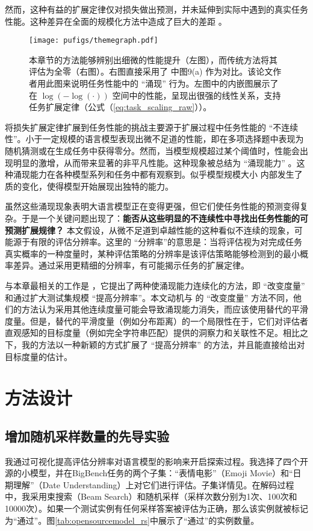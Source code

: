 然而，这种有益的扩展定律仅对损失做出预测，并未延伸到实际中遇到的真实任务性能。这种差异在全面的规模化方法中造成了巨大的差距 \citep{ganguli2022predictability}。

\begin{figure}[!htbp]
        \centering
        \texttt{[image: pufigs/themegraph.pdf]}
    \caption{本章节的方法能够辨别出细微的性能提升（左图），而传统方法将其评估为全零（右图）。右图直接采用了 \citet{sorscher2022beyond} 中图9(a) 作为对比。该论文作者用此图来说明任务性能中的 “涌现” 行为。左图中的内嵌图展示了在 $\log(-\log(\cdot))$ 空间中的性能，呈现出很强的线性关系，支持任务扩展定律（公式（\ref{eq:task_scaling_raw}））。}
    \label{fig:themefig}
\end{figure}

将损失扩展定律扩展到任务性能的挑战主要源于扩展过程中任务性能的 “不连续性”。小于一定规模的语言模型表现出微不足道的性能，即在多项选择题中表现为随机猜测或在生成任务中获得零分。然而，当模型规模超过某个阈值时，性能会出现明显的激增，从而带来显著的非平凡性能。这种现象被总结为 “涌现能力” \citep{srivastava2022beyond, wei2022emergent}。这种涌现能力在各种模型系列和任务中都有观察到。似乎模型规模大小 内部发生了质的变化，使得模型开始展现出独特的能力。

虽然这些涌现现象表明大语言模型正在变得更强，但它们使任务性能的预测变得复杂。于是一个关键问题出现了：\textbf{能否从这些明显的不连续性中寻找出任务性能的可预测扩展规律？} 本文假设，从微不足道到卓越性能的这种看似不连续的现象，可能源于有限的评估分辨率。这里的 “分辨率”的意思是：当将评估视为对完成任务真实概率的一种度量时，某种评估策略的分辨率是该评估策略能够检测到的最小概率差异。通过采用更精细的分辨率，有可能揭示任务的扩展定律。 

与本章最相关的工作是 \citet{schaeffer2023emergent}，它提出了两种使涌现能力连续化的方法，即 “改变度量” 和通过扩大测试集规模 “提高分辨率”。本文动机与 \citet{schaeffer2023emergent} 的 “改变度量” 方法不同，他们的方法认为采用其他连续度量可能会导致涌现能力消失，而应该使用替代的平滑度量。但是，替代的平滑度量（例如分布距离）的一个局限性在于，它们对评估者直观感知的目标度量（例如完全字符串匹配）提供的洞察力和关联性不足。相比之下，我的方法以一种新颖的方式扩展了 “提高分辨率” 的方法，并且能直接给出对目标度量的估计。

\section{方法设计}
\subsection{增加随机采样数量的先导实验}
\label{sec:pilot}
我通过可视化提高评估分辨率对语言模型的影响来开启探索过程。我选择了四个开源的小模型，并在BigBench任务的两个子集\citep{srivastava2022beyond}：“表情电影”（Emoji Movie）和“日期理解”（Date Understanding）上对它们进行评估。子集详情见。在解码过程中，我采用束搜索（Beam Search）和随机采样（采样次数分别为1次、100次和10000次）。如果一个测试实例有任何采样答案被评估为正确，那么该实例就被标记为“通过”。图\ref{tab:opensourcemodel_rs}中展示了“通过”的实例数量。

